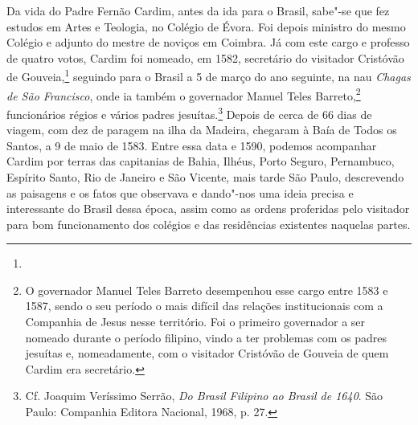  Da vida do Padre Fernão Cardim, antes da ida para o Brasil, sabe"-se
que fez estudos em Artes e Teologia, no Colégio de Évora. Foi depois
ministro do mesmo Colégio e adjunto do mestre de noviços em Coimbra. Já
com este cargo e professo de quatro votos, Cardim foi nomeado, em 1582,
secretário do visitador Cristóvão de Gouveia,\footnote{} 
seguindo para o Brasil a 5 de março do ano seguinte, na nau
\textit{Chagas de São Francisco}, onde ia também o governador Manuel
Teles Barreto,\footnote{ O governador Manuel Teles Barreto
desempenhou esse cargo entre 1583 e 1587, sendo o seu período o mais
difícil das relações institucionais com a Companhia de Jesus nesse
território. Foi o primeiro governador a ser nomeado durante o período
filipino, vindo a ter problemas com os padres jesuítas e, nomeadamente,
com o visitador Cristóvão de Gouveia de quem Cardim era secretário.} 
funcionários régios e vários padres jesuítas.\footnote{ Cf.
Joaquim Veríssimo Serrão, \textit{Do Brasil Filipino ao Brasil de 1640}. 
São Paulo: Companhia Editora Nacional, 1968, p. 27.} Depois de cerca
de 66 dias de viagem, com dez de paragem na ilha da
Madeira, chegaram à Baía de Todos os Santos, a 9 de maio de 1583. Entre
essa data e 1590, podemos acompanhar Cardim por terras das capitanias
de Bahia, Ilhéus, Porto Seguro, Pernambuco, Espírito Santo, Rio de
Janeiro e São Vicente, mais tarde São Paulo, descrevendo as paisagens e
os fatos que observava e dando"-nos uma ideia precisa e interessante do
Brasil dessa época, assim como as ordens proferidas pelo visitador para
bom funcionamento dos colégios e das residências existentes naquelas partes.

